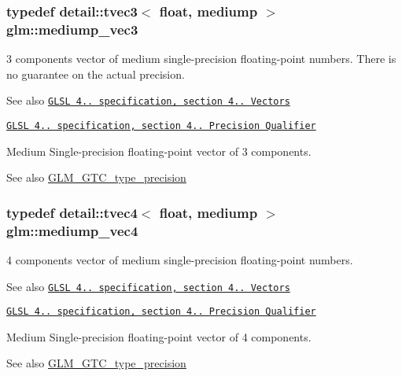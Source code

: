 \subsubsection[{\texorpdfstring{mediump\+\_\+vec3}{mediump_vec3}}]{\setlength{\rightskip}{0pt plus 5cm}typedef detail\+::tvec3$<$ float, mediump $>$ {\bf glm\+::mediump\+\_\+vec3}}\hypertarget{group__core__precision_ga10acc767a046b85205f52ce7f834626f}{}\label{group__core__precision_ga10acc767a046b85205f52ce7f834626f}
3 components vector of medium single-\/precision floating-\/point numbers. There is no guarantee on the actual precision.

\begin{DoxySeeAlso}{See also}
\href{http://www.opengl.org/registry/doc/GLSLangSpec.4.20.8.pdf}{\tt G\+L\+SL 4.. specification, section 4.. Vectors} 

\href{http://www.opengl.org/registry/doc/GLSLangSpec.4.20.8.pdf}{\tt G\+L\+SL 4.. specification, section 4.. Precision Qualifier}
\end{DoxySeeAlso}
Medium Single-\/precision floating-\/point vector of 3 components. \begin{DoxySeeAlso}{See also}
\hyperlink{group__gtc__type__precision}{G\+L\+M\+\_\+\+G\+T\+C\+\_\+type\+\_\+precision} 
\end{DoxySeeAlso}
\subsubsection[{\texorpdfstring{mediump\+\_\+vec4}{mediump_vec4}}]{\setlength{\rightskip}{0pt plus 5cm}typedef detail\+::tvec4$<$ float, mediump $>$ {\bf glm\+::mediump\+\_\+vec4}}\hypertarget{group__core__precision_ga2527a7f322907fecd58bef0a7a9c3ecd}{}\label{group__core__precision_ga2527a7f322907fecd58bef0a7a9c3ecd}
4 components vector of medium single-\/precision floating-\/point numbers.

\begin{DoxySeeAlso}{See also}
\href{http://www.opengl.org/registry/doc/GLSLangSpec.4.20.8.pdf}{\tt G\+L\+SL 4.. specification, section 4.. Vectors} 

\href{http://www.opengl.org/registry/doc/GLSLangSpec.4.20.8.pdf}{\tt G\+L\+SL 4.. specification, section 4.. Precision Qualifier}
\end{DoxySeeAlso}
Medium Single-\/precision floating-\/point vector of 4 components. \begin{DoxySeeAlso}{See also}
\hyperlink{group__gtc__type__precision}{G\+L\+M\+\_\+\+G\+T\+C\+\_\+type\+\_\+precision} 
\end{DoxySeeAlso}

